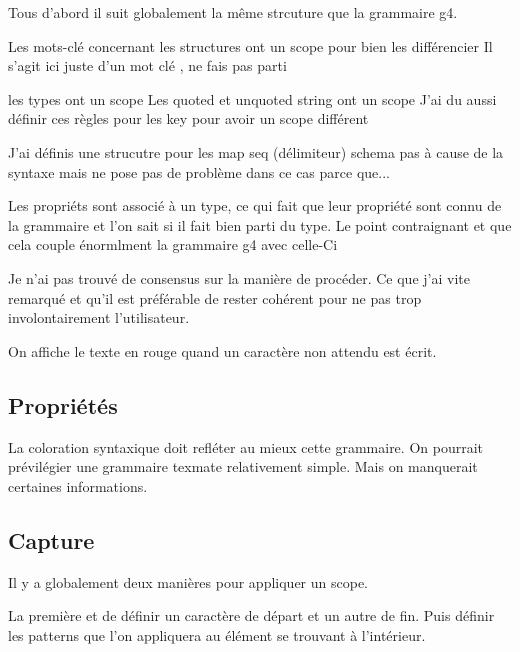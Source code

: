 \documentclass[
    iict, %
    il, %
]{heig-tb}
\begin{document}
Tous d'abord il suit globalement la même strcuture que la grammaire g4.

Les mots-clé concernant les structures ont un scope pour bien les différencier
Il s'agit ici juste d'un mot clé , ne fais pas parti

les types ont un scope
Les quoted et unquoted string ont un scope
J'ai du aussi définir ces règles pour les key pour avoir un scope différent

J'ai définis une strucutre pour les map seq (délimiteur) schema pas à cause de la syntaxe mais ne pose pas de problème dans ce cas parce que...

Les propriéts sont associé à un type, ce qui fait que leur propriété sont connu de la grammaire et l'on sait si il fait bien parti du type.
Le point contraignant et que cela couple énormlment la grammaire g4 avec celle-Ci


Je n'ai pas trouvé de consensus sur la manière de procéder. Ce que j'ai vite remarqué et qu'il est préférable de rester cohérent pour ne pas
trop involontairement l'utilisateur.


On affiche le texte en rouge quand un caractère non attendu est écrit.

\subsection{Propriétés}

La coloration syntaxique doit refléter au mieux cette grammaire. On pourrait prévilégier une grammaire texmate relativement simple. Mais on manquerait certaines informations.




\subsection{Capture}

Il y a globalement deux manières pour appliquer un scope.

La première et de définir un caractère de départ et un autre de fin. Puis définir les patterns que l'on appliquera au élément se trouvant à l'intérieur.
\end{document}
